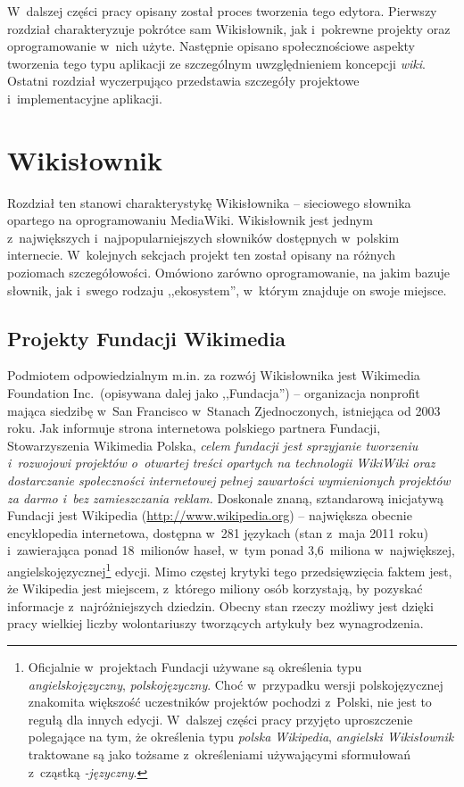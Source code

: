 \documentclass{pracamgr}
\begin{document}
W~dalszej części pracy opisany został proces tworzenia tego edytora. Pierwszy rozdział charakteryzuje pokrótce sam Wikisłownik, jak i~pokrewne projekty oraz oprogramowanie w~nich użyte. Następnie opisano społecznościowe aspekty tworzenia tego typu aplikacji ze szczególnym uwzględnieniem koncepcji \emph{wiki}. Ostatni rozdział wyczerpująco przedstawia szczegóły projektowe i~implementacyjne aplikacji.

\chapter{Wikisłownik}
Rozdział ten stanowi charakterystykę Wikisłownika -- sieciowego słownika opartego na oprogramowaniu MediaWiki. Wikisłownik jest jednym z~największych i~najpopularniejszych słowników dostępnych w~polskim internecie. W~kolejnych sekcjach projekt ten został opisany na różnych poziomach szczegółowości. Omówiono zarówno oprogramowanie, na jakim bazuje słownik, jak i~swego rodzaju ,,ekosystem'', w~którym znajduje on swoje miejsce.

\section{Projekty Fundacji Wikimedia}
Podmiotem odpowiedzialnym m.in. za rozwój Wikisłownika jest Wikimedia Foundation Inc.\ (opisywana dalej jako ,,Fundacja'') -- organizacja non\dywiz{}profit mająca siedzibę w~San Francisco w~Stanach Zjednoczonych, istniejąca od 2003 roku. Jak informuje strona internetowa polskiego partnera Fundacji, Stowarzyszenia Wikimedia Polska, \emph{celem fundacji jest sprzyjanie tworzeniu i~rozwojowi projektów o~otwartej treści opartych na technologii WikiWiki oraz dostarczanie społeczności internetowej pełnej zawartości wymienionych projektów za darmo i~bez zamieszczania reklam.} %
Doskonale znaną, sztandarową inicjatywą Fundacji jest Wikipedia (\url{http://www.wikipedia.org}) -- największa obecnie encyklopedia internetowa, dostępna w~281 językach (stan z~maja 2011 roku) i~zawierająca ponad 18~milionów haseł, w~tym ponad 3,6~miliona w~największej, angielskojęzycznej\footnote{Oficjalnie w~projektach Fundacji używane są określenia typu \emph{angielskojęzyczny}, \emph{polskojęzyczny}. Choć w~przypadku wersji polskojęzycznej znakomita większość uczestników projektów pochodzi z~Polski, nie jest to regułą dla innych edycji. W~dalszej części pracy przyjęto uproszczenie polegające na tym, że określenia typu \emph{polska Wikipedia}, \emph{angielski Wikisłownik} traktowane są jako tożsame z~określeniami używającymi sformułowań z~cząstką \emph{-języczny}.} edycji. Mimo częstej krytyki tego przedsięwzięcia faktem jest, że Wikipedia jest miejscem, z~którego miliony osób korzystają, by pozyskać informacje z~najróżniejszych dziedzin. Obecny stan rzeczy możliwy jest dzięki pracy wielkiej liczby wolontariuszy tworzących artykuły bez wynagrodzenia.
\end{document}
